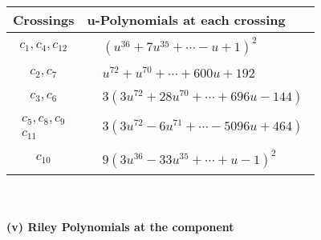 \documentclass[1p]{elsarticle_modified}
\theoremstyle{definition}
\begin{document}
\begin{tabular}{m{50pt}|m{274pt}}
Crossings & \hspace{64pt}u-Polynomials at each crossing \\
\hline $$\begin{aligned}c_{1},c_{4},c_{12}\end{aligned}$$&$\begin{aligned}
&(u^{36}+7 u^{35}+\cdots- u+1)^{2}
\end{aligned}$\\
\hline $$\begin{aligned}c_{2},c_{7}\end{aligned}$$&$\begin{aligned}
&u^{72}+u^{70}+\cdots+600 u+192
\end{aligned}$\\
\hline $$\begin{aligned}c_{3},c_{6}\end{aligned}$$&$\begin{aligned}
&3(3 u^{72}+28 u^{70}+\cdots+696 u-144)
\end{aligned}$\\
\hline $$\begin{aligned}c_{5},c_{8},c_{9}\\c_{11}\end{aligned}$$&$\begin{aligned}
&3(3 u^{72}-6 u^{71}+\cdots-5096 u+464)
\end{aligned}$\\
\hline $$\begin{aligned}c_{10}\end{aligned}$$&$\begin{aligned}
&9(3 u^{36}-33 u^{35}+\cdots+u-1)^{2}
\end{aligned}$\\
\hline
\end{tabular}\\~\\
\newpage\renewcommand{\arraystretch}{1}
\flushleft \textbf{(v) Riley Polynomials at the component}\newline \\
\end{document}
